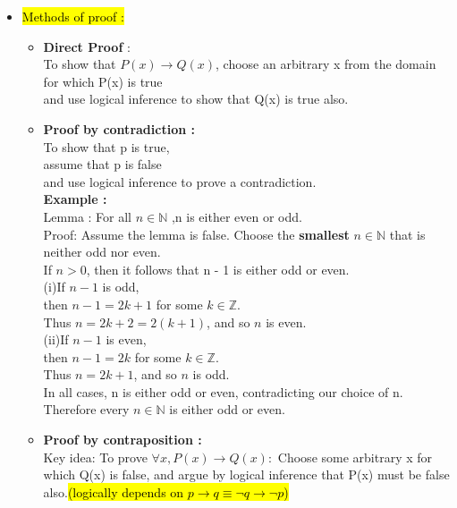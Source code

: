 \documentclass{article}
\begin{document}
\begin{itemize}
\item \hl{Methods of proof : }
\begin{itemize}
\item \textbf{Direct Proof }: \\
To show that $P(x) \rightarrow  Q(x)$,
choose an arbitrary x from the domain for which P(x) is true\\
and use logical inference to show that Q(x) is true also.
\item  \textbf{Proof by contradiction :} \\
To show that p is true,\\
assume that p is false\\
and use logical inference to prove a contradiction.\\

\textbf{Example : }\\
Lemma : For all $n \in \mathbb{N}$ ,n is either even or odd.\\

Proof: Assume the lemma is false. Choose the \textbf{smallest} $n \in \mathbb{N}$ that is
neither odd nor even.\\
If $n > 0$, then it follows that n - 1 is either odd or even.\\

(i)If \( n - 1 \) is odd, \\
then \( n - 1 = 2k + 1 \) for some \( k \in \mathbb{Z} \). \\
Thus \( n = 2k + 2 = 2(k + 1) \), and so \( n \) is even. \\

(ii)If \( n - 1 \) is even, \\
then \( n - 1 = 2k \) for some \( k \in \mathbb{Z} \). \\
Thus \( n = 2k + 1 \), and so \( n \) is odd.\\

In all cases, n is either odd or even, contradicting our choice of n.
Therefore every $n \in \mathbb{N}$ is either odd or even.\\

\item \textbf{Proof by contraposition :} \\
Key idea: To prove $\forall x, P(x) \rightarrow Q(x):$
Choose some arbitrary x for which Q(x) is false,
and argue by logical inference that P(x) must be false also.\hl{(logically depends on $p \rightarrow q \equiv \neg q \rightarrow \neg p $)}\\


\end{itemize}
\end{itemize}
\end{document}
